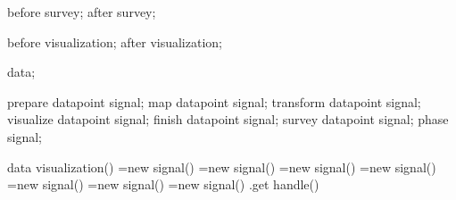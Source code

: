{


  \attribute before survey;
  \attribute after survey;


  \attribute before visualization;
  \attribute after visualization;

  
  \attribute data;

  
  \attribute prepare datapoint signal;
  \attribute map datapoint signal;
  \attribute transform datapoint signal;
  \attribute visualize datapoint signal;
  \attribute finish datapoint signal;
  \attribute survey datapoint signal;
  \attribute phase signal;

  
  \method data visualization() {
    \pgfoonew \pgf@signalpreparedatapoint=new signal()%
    \pgf@signalpreparedatapoint
    \pgfoonew \pgf@signalmapdatapoint=new signal()%
    \pgf@signalmapdatapoint
    \pgfoonew \pgf@signaltransformdatapoint=new signal()%
    \pgf@signaltransformdatapoint
    \pgfoonew \pgf@signalvisualizedatapoint=new signal()%
    \pgf@signalvisualizedatapoint
    \pgfoonew \pgf@signalfinishdatapoint=new signal()%
    \pgf@signalfinishdatapoint
    \pgfoonew \pgf@signalsurveydatapoint=new signal()%
    \pgf@signalsurveydatapoint
    \pgfoonew \pgf@signalphase=new signal()%
    \pgf@signalphase
    \pgfoothis.get handle(\pgf@dv@me)
    \pgf@dv@me
  }

}
